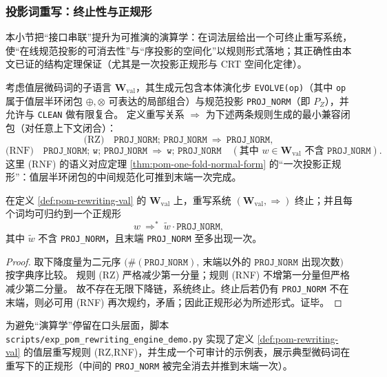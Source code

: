 \subsubsection{投影词重写：终止性与正规形}\label{subsec:pom-rewriting-calculus}
本小节把“接口串联”提升为可推演的演算学：在词法层给出一个可终止重写系统，使“在线规范投影的可消去性”与“序投影的空间化”以规则形式落地；其正确性由本文已证的结构定理保证（尤其是一次投影正规形与 CRT 空间化定律）。

\begin{definition}[值层投影词语言与规范化重写]\label{def:pom-rewriting-val}
考虑值层微码词的子语言 \(\mathbf{W}_{\mathrm{val}}\)，其生成元包含本体演化步 \texttt{EVOLVE(op)}（其中 \texttt{op} 属于值层半环闭包 \(\oplus,\otimes\) 可表达的局部组合）与规范投影 \texttt{PROJ\_NORM}（即 \(P_Z\)），并允许与 \texttt{CLEAN} 做有限复合。
定义重写关系 \(\Rightarrow\) 为下述两条规则生成的最小兼容闭包（对任意上下文闭合）：
\[
\text{(RZ)}\quad
\texttt{PROJ\_NORM;\ PROJ\_NORM}\ \Rightarrow\ \texttt{PROJ\_NORM},
\]
\[
\text{(RNF)}\quad
\texttt{PROJ\_NORM;\ w;\ PROJ\_NORM}\ \Rightarrow\ \texttt{w;\ PROJ\_NORM}
\quad (\text{其中 }w\in\mathbf{W}_{\mathrm{val}}\text{ 不含 }\texttt{PROJ\_NORM}).
\]
这里 (RNF) 的语义对应定理 \ref{thm:pom-one-fold-normal-form} 的“一次投影正规形”：值层半环闭包的中间规范化可推到末端一次完成。
\end{definition}

\begin{proposition}[终止性与正规形存在（值层）]\label{prop:pom-rewriting-terminating}
在定义 \ref{def:pom-rewriting-val} 的 \(\mathbf{W}_{\mathrm{val}}\) 上，重写系统 \((\mathbf{W}_{\mathrm{val}},\Rightarrow)\) 终止；并且每个词均可归约到一个正规形
\[
w\ \Rightarrow^\ast\ \widetilde w\cdot \texttt{PROJ\_NORM},
\]
其中 \(\widetilde w\) 不含 \texttt{PROJ\_NORM}，且末端 \texttt{PROJ\_NORM} 至多出现一次。
\end{proposition}
\begin{proof}
取下降度量为二元序
\(
\big(\#(\texttt{PROJ\_NORM}),\ \text{末端以外的 }\texttt{PROJ\_NORM}\text{ 出现次数}\big)
\)
按字典序比较。
规则 (RZ) 严格减少第一分量；规则 (RNF) 不增第一分量但严格减少第二分量。
故不存在无限下降链，系统终止。终止后若仍有 \texttt{PROJ\_NORM} 不在末端，则必可用 (RNF) 再次规约，矛盾；因此正规形必为所述形式。证毕。
\end{proof}

\begin{remark}\label{rem:pom-rewriting-engine-demo}
为避免“演算学”停留在口头层面，脚本 \texttt{scripts/exp\_pom\_rewriting\_engine\_demo.py} 实现了定义 \ref{def:pom-rewriting-val} 的值层重写规则 (RZ,RNF)，并生成一个可审计的示例表，展示典型微码词在重写下的正规形（中间的 \texttt{PROJ\_NORM} 被完全消去并推到末端一次）。

\end{remark}

